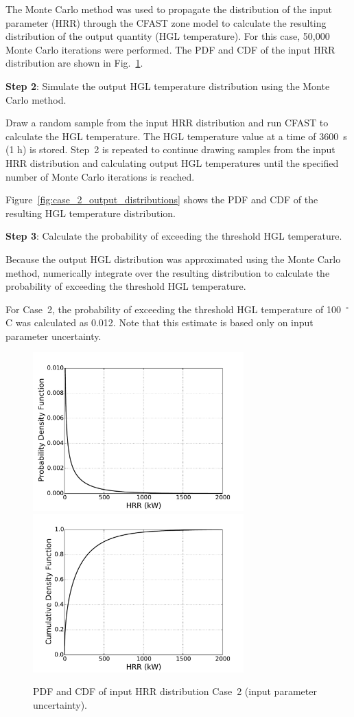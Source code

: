 \documentclass[12pt]{article}
\begin{document}
The Monte Carlo method was used to propagate the distribution of the input parameter (HRR) through the CFAST zone model to calculate the resulting distribution of the output quantity (HGL temperature). For this case, 50,000 Monte Carlo iterations were performed. The PDF and CDF of the input HRR distribution are shown in Fig.~\ref{fig:case_2_input_distributions}.

\textbf{Step 2}: Simulate the output HGL temperature distribution using the Monte Carlo method.

Draw a random sample from the input HRR distribution and run CFAST to calculate the HGL temperature. The HGL temperature value at a time of 3600~s (1 h) is stored. Step~2 is repeated to continue drawing samples from the input HRR distribution and calculating output HGL temperatures until the specified number of Monte Carlo iterations is reached.

Figure~\ref{fig:case_2_output_distributions} shows the PDF and CDF of the resulting HGL temperature distribution.

\textbf{Step 3}: Calculate the probability of exceeding the threshold HGL temperature.

Because the output HGL distribution was approximated using the Monte Carlo method, numerically integrate over the resulting distribution to calculate the probability of exceeding the threshold HGL temperature.

For Case~2, the probability of exceeding the threshold HGL temperature of 100~$^\circ$C was calculated as 0.012. Note that this estimate is based only on input parameter uncertainty.

\clearpage


\begin{figure}[p]
\includegraphics[width=3.2in]{Figures/input_PDF}
\includegraphics[width=3.2in]{Figures/input_CDF}
\caption{PDF and CDF of input HRR distribution Case~2 (input parameter uncertainty).}
\label{fig:case_2_input_distributions}
\end{figure}
\end{document}
